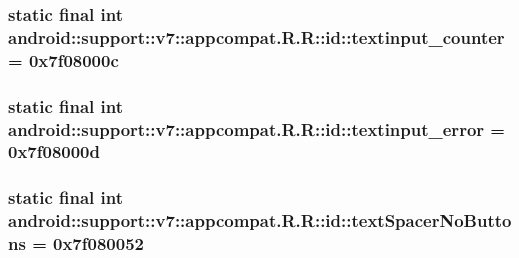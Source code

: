 \hypertarget{classandroid_1_1support_1_1v7_1_1appcompat_1_1_r_1_1id_9cbe580cd26efa00d1d94d73f3eb24ab}{
\subsubsection[{textinput\_\-counter}]{\setlength{\rightskip}{0pt plus 5cm}static final int android::support::v7::appcompat.R.R::id::textinput\_\-counter = 0x7f08000c}}
\label{classandroid_1_1support_1_1v7_1_1appcompat_1_1_r_1_1id_9cbe580cd26efa00d1d94d73f3eb24ab}


\hypertarget{classandroid_1_1support_1_1v7_1_1appcompat_1_1_r_1_1id_dc637544ff02fe35443be2cabd8593c7}{
\subsubsection[{textinput\_\-error}]{\setlength{\rightskip}{0pt plus 5cm}static final int android::support::v7::appcompat.R.R::id::textinput\_\-error = 0x7f08000d}}
\label{classandroid_1_1support_1_1v7_1_1appcompat_1_1_r_1_1id_dc637544ff02fe35443be2cabd8593c7}


\hypertarget{classandroid_1_1support_1_1v7_1_1appcompat_1_1_r_1_1id_c8d080d7b375bebb57eb916ae6cfbd99}{
\subsubsection[{textSpacerNoButtons}]{\setlength{\rightskip}{0pt plus 5cm}static final int android::support::v7::appcompat.R.R::id::textSpacerNoButtons = 0x7f080052}}
\label{classandroid_1_1support_1_1v7_1_1appcompat_1_1_r_1_1id_c8d080d7b375bebb57eb916ae6cfbd99}


